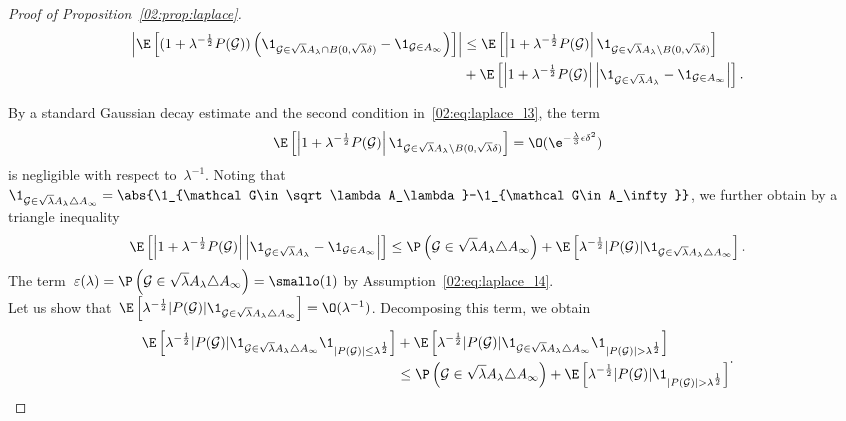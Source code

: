 \begin{proof}[Proof of Proposition~\ref{02:prop:laplace}]
            \begin{equation}
                \label{02:eq:laplace_error_bb}
                \begin{aligned}
                    \left|\E\left[(1+\lambda^{-\frac12}P({\mathcal G}))\left(\1_{{\mathcal G}\in\sqrt\lambda A_\lambda \cap B(0,\sqrt\lambda\delta)}-\1_{{\mathcal G}\in A_\infty}\right)\right]\right| &\leq \E\left[\left|1 + \lambda^{-\frac12}P({\mathcal G})\right|\1_{{\mathcal G}\in\sqrt\lambda A_\lambda \setminus B(0,\sqrt\lambda\delta)}\right]\\
                    &+ \E\left[\left|1 + \lambda^{-\frac12}P({\mathcal G})\right|\left|\1_{{\mathcal G} \in \sqrt\lambda A_\lambda}-\1_{{\mathcal G} \in A_\infty}\right|\right].
                \end{aligned}
            \end{equation}

            By a standard Gaussian decay estimate and the second condition in~\eqref{02:eq:laplace_l3}, the term
            \[ \E\left[\left|1 + \lambda^{-\frac12}P({\mathcal G})\right|\1_{\mathcal G\in\sqrt\lambda A_\lambda \setminus B(0,\sqrt\lambda\delta)}\right] = \O(\e^{-\frac{\lambda}3\epsilon \delta^2})\]
            is negligible with respect to~$\lambda^{-1}$. Noting that~$\1_{\mathcal G\in\sqrt\lambda A_\lambda \triangle A_\infty} = \abs{\1_{\mathcal G\in\sqrt\lambda A_\lambda}-\1_{\mathcal G\in A_\infty}}$, we further obtain by a triangle inequality
            \[\E\left[\left|1 + \lambda^{-\frac12}P({\mathcal G})\right|\left|\1_{{\mathcal G}\in\sqrt\lambda A_\lambda}-\1_{{\mathcal G} \in A_\infty}\right|\right] \leq \P\left({\mathcal G} \in \sqrt\lambda A_\lambda \triangle A_\infty\right) + \E\left[\lambda^{-\frac12}|P({\mathcal G})|\1_{\mathcal G\in\sqrt\lambda A_\lambda \triangle A_\infty}\right].\]
            The term~$\varepsilon(\lambda)=\P\left({\mathcal G} \in \sqrt\lambda A_\lambda \triangle A_\infty\right)=\smallo(1)$ by Assumption~\eqref{02:eq:laplace_l4}.\\ Let us show that~$\E\left[\lambda^{-\frac12}|P({\mathcal G})|\1_{\mathcal G\in\sqrt\lambda A_\lambda \triangle A_\infty}\right]=\O(\lambda^{-1})$.
            Decomposing this term, we obtain
            \begin{equation}\label{02:eq:laplace_error_c}\begin{aligned}\E\left[\lambda^{-\frac12}|P({\mathcal G})|\1_{\mathcal G\in\sqrt\lambda A_\lambda \triangle A_\infty}\1_{|P({\mathcal G})|\leq \lambda^{\frac12}}\right] &+ \E\left[\lambda^{-\frac12}|P({\mathcal G})|\1_{\mathcal G\in\sqrt\lambda A_\lambda \triangle A_\infty}\1_{|P({\mathcal G})|>\lambda^{\frac12}}\right]\\
                &\leq \P\left({\mathcal G} \in \sqrt\lambda A_\lambda \triangle A_\infty\right) + \E\left[\lambda^{-\frac12}|P({\mathcal G})|\1_{|P({\mathcal G})|>\lambda^{\frac12}}\right]\end{aligned}.\end{equation}


\end{proof}
